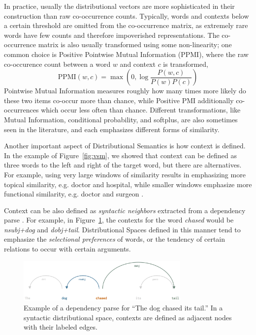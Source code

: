\documentclass[12pt]{article}
\begin{document}
In practice, usually the distributional vectors are more sophisticated in their
construction than raw co-occurrence counts. Typically, words and contexts below
a certain threshold are omitted from the co-occurrence matrix, as extremely
rare words have few counts and therefore impoverished representations. The
co-occurrence matrix is also usually transformed using some non-linearity;
one common choice is Positive Pointwise Mutual Information (PPMI), where the
raw co-occurence count between a word $w$ and context $c$ is transformed,
\begin{equation*}
  \text{PPMI}(w, c) = \max\left(0, \log\frac{P(w, c)}{P(w)P(c)}\right)
\end{equation*}
Pointwise Mutual Information measures roughly how many times more likely
do these two items co-occur more than chance, while Positive PMI additionally
co-occurrences which occur less often than chance. Different transformations,
like Mutual Information, conditional probability, and softplus, are also
sometimes seen in the literature, and each emphasizes different forms of
similarity.

Another important aspect of Distributional Semantics is how context is defined.
In the example of Figure~\ref{fig:vsm}, we showed that context can be defined
as three words to the left and right of the target word, but there are
alternatives. For example, using very large windows of similarity results in
emphasizing more topical similarity, e.g. doctor and hospital, while smaller
windows emphasize more functional similarity, e.g. doctor and surgeon
\cite{needcite,levy:2014:acl}.

Context can be also defined as {\em syntactic neighbors} extracted
from a dependency parse \cite{pado:2007:cl}. For example, in Figure~\ref{fig:syn},
the contexts for the word {\em chased} would be {\em nsubj+dog} and {\em
dobj+tail}. Distributional Spaces defined in this manner tend to emphasize
the {\em selectional preferences} of words, or the tendency of certain
relations to occur with certain arguments.

\begin{figure}
  \centering
  \includegraphics[width=0.75\textwidth]{figures/syn}
\caption{Example of a dependency parse for ``The dog chased its tail.'' In
a syntactic distributional space, contexts are defined as adjacent nodes
with their labeled edges.}
\label{fig:syn}
\end{figure}
\end{document}

